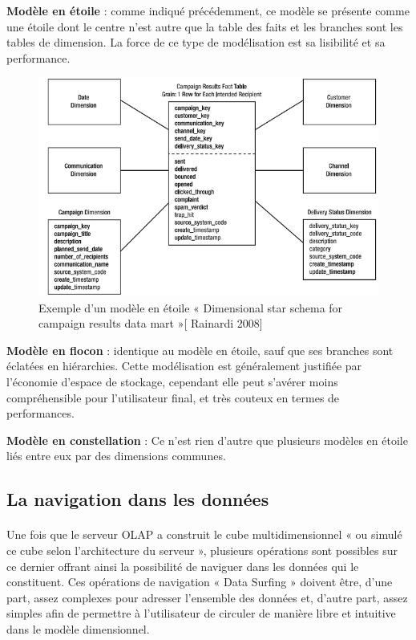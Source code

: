   \textbf{Modèle en étoile} : comme indiqué précédemment, ce modèle se présente comme une étoile dont le centre n’est autre que la table des faits et les branches sont les tables de dimension. La force de ce type de modélisation est sa lisibilité et sa performance. 
  
  \begin{figure}[h]
	\begin{center}
		\includegraphics[scale=0.85]{images/etoile.png}
		\caption{Exemple d'un modèle en étoile « Dimensional star schema for campaign results data mart »[ Rainardi 2008]}
		\label{model-en-etoile}
	\end{center}
\end{figure}
\textbf{Modèle en flocon} : identique au modèle en étoile, sauf que ses branches sont éclatées en hiérarchies. Cette modélisation est généralement justifiée par l'économie d'espace de stockage, cependant elle peut s’avérer moins compréhensible pour l'utilisateur final, et très couteux en termes de performances.

\textbf{Modèle en constellation} : Ce n'est rien d'autre que plusieurs modèles en étoile liés entre eux par des dimensions communes.

  
  \subsection{La navigation dans les données}
  
  \paragraph{}
  Une fois que le serveur OLAP a construit le cube multidimensionnel « ou simulé ce cube selon l’architecture du serveur », plusieurs opérations sont possibles sur ce dernier offrant ainsi la possibilité de naviguer dans les données qui le constituent. Ces opérations de navigation « Data Surfing » doivent être, d’une part, assez complexes pour adresser l’ensemble des données et, d’autre part, assez simples afin de permettre à l’utilisateur de circuler de manière libre et intuitive dans le modèle dimensionnel.\\
  

